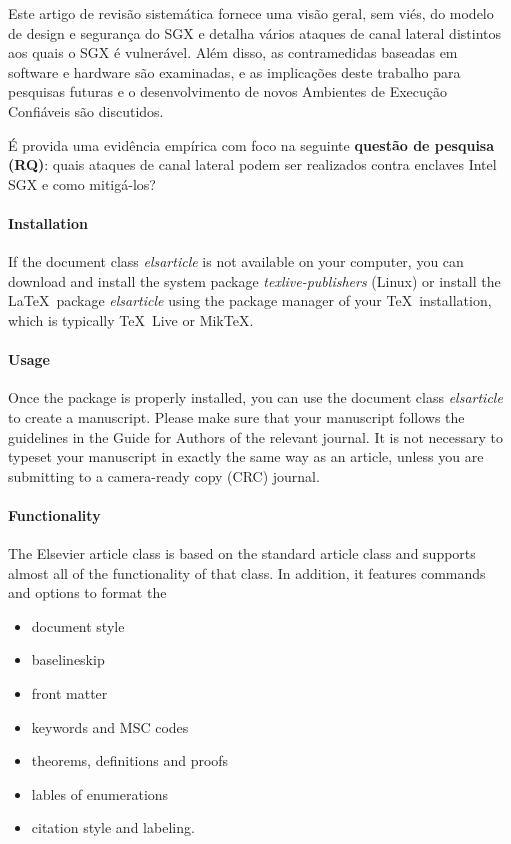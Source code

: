 \documentclass[review]{elsarticle}
\begin{document}
Este artigo de revisão sistemática fornece uma visão geral, sem viés, do modelo de design e segurança do SGX e detalha vários ataques de canal lateral distintos aos quais o SGX é vulnerável. Além disso, as contramedidas baseadas em software e hardware são examinadas, e as implicações deste trabalho para pesquisas futuras e o desenvolvimento de novos Ambientes de Execução Confiáveis são discutidos.

É provida uma evidência empírica com foco na seguinte \textbf{questão de pesquisa (RQ)}: quais ataques de canal lateral podem ser realizados contra enclaves Intel SGX e como mitigá-los?



\paragraph{Installation} If the document class \emph{elsarticle} is not available on your computer, you can download and install the system package \emph{texlive-publishers} (Linux) or install the \LaTeX\ package \emph{elsarticle} using the package manager of your \TeX\ installation, which is typically \TeX\ Live or Mik\TeX.

\paragraph{Usage} Once the package is properly installed, you can use the document class \emph{elsarticle} to create a manuscript. Please make sure that your manuscript follows the guidelines in the Guide for Authors of the relevant journal. It is not necessary to typeset your manuscript in exactly the same way as an article, unless you are submitting to a camera-ready copy (CRC) journal.

\paragraph{Functionality} The Elsevier article class is based on the standard article class and supports almost all of the functionality of that class. In addition, it features commands and options to format the
\begin{itemize}
\item document style
\item baselineskip
\item front matter
\item keywords and MSC codes
\item theorems, definitions and proofs
\item lables of enumerations
\item citation style and labeling.
\end{itemize}
\end{document}
